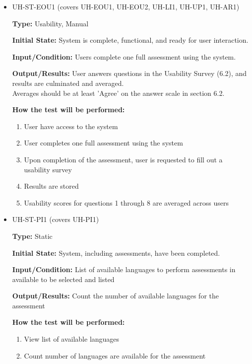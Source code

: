 \documentclass[12pt, titlepage]{article}
\begin{document}
\begin{itemize}
  \item UH-ST-EOU1 (covers UH-EOU1, UH-EOU2, UH-LI1, UH-UP1, UH-AR1)
  \begin{mdframed}[linewidth=0.5mm]
      \textbf{Type:} Usability, Manual\par
      \textbf{Initial State:} System is complete, functional, and ready for user interaction. \par
      \textbf{Input/Condition:} Users complete one full assessment using the system. \par
      \textbf{Output/Results:} User answers questions in the Usability Survey (6.2), and results are culminated and averaged.\\
      Averages should be at least 'Agree' on the answer scale in section 6.2. \par
      \textbf{How the test will be performed:}
      \begin{enumerate}[noitemsep]
        \item User have access to the system
        \item User completes one full assessment using the system
        \item Upon completion of the assessment, user is requested to fill out a usability survey
        \item Results are stored
        \item Usability scores for questions 1 through 8 are averaged across users
      \end{enumerate}
  \end{mdframed}
  \item UH-ST-PI1 (covers UH-PI1)
  \begin{mdframed}[linewidth=0.5mm]
      \textbf{Type:} Static \par
      \textbf{Initial State:} System, including assessments, have been completed. \par
      \textbf{Input/Condition:} List of available languages to perform assessments in  \\ available to be selected and listed\par
      \textbf{Output/Results:} Count the number of available languages for the assessment \par
      \textbf{How the test will be performed:}
      \begin{enumerate}[noitemsep]
        \item View list of available languages
        \item Count number of languages are available for the assessment

\end{enumerate}
\end{mdframed}
\end{itemize}
\end{document}
